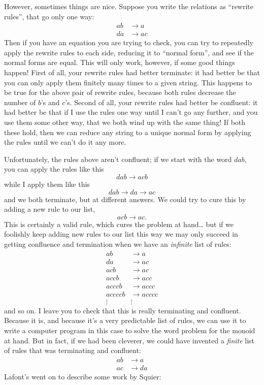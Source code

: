\documentclass{article}
\begin{document}
However, sometimes things are nice. Suppose you write the relations as
``rewrite rules'', that go only one way: \[
  \begin{aligned}
    ab &\to a
  \\da &\to ac
  \end{aligned}
\] Then if you have an equation you are trying to check, you can try to
repeatedly apply the rewrite rules to each side, reducing it to ``normal
form'', and see if the normal forms are equal. This will only work,
however, if some good things happen! First of all, your rewrite rules
had better terminate: it had better be that you can only apply them
finitely many times to a given string. This happens to be true for the
above pair of rewrite rules, because both rules decrease the number of
\(b\)'s and \(c\)'s. Second of all, your rewrite rules had better be
confluent: it had better be that if I use the rules one way until I
can't go any further, and you use them some other way, that we both wind
up with the same thing! If both these hold, then we can reduce any
string to a unique normal form by applying the rules until we can't do
it any more.

Unfortunately, the rules above aren't confluent; if we start with the
word \(dab\), you can apply the rules like this \[dab \to acb\] while I
apply them like this \[dab \to da \to ac\] and we both terminate, but at
different answers. We could try to cure this by adding a new rule to our
list, \[acb \to ac.\] This is certainly a valid rule, which cures the
problem at hand\ldots{} but if we foolishly keep adding new rules to our
list this way we may only succeed in getting confluence and termination
when we have an \emph{infinite} list of rules: \[
  \begin{aligned}
    ab &\to a
  \\da &\to ac
  \\acb &\to ac
  \\accb &\to acc
  \\acccb &\to accc
  \\accccb &\to acccc
  \\\vdots & \vdots
  \end{aligned}
\] and so on. I leave you to check that this is really terminating and
confluent. Because it is, and because it's a very predictable list of
rules, we can use it to write a computer program in this case to solve
the word problem for the monoid at hand. But in fact, if we had been
cleverer, we could have invented a \emph{finite} list of rules that was
terminating and confluent: \[
  \begin{aligned}
    ab &\to a
  \\ac &\to da
  \end{aligned}
\] Lafont's went on to describe some work by Squier:
\end{document}

